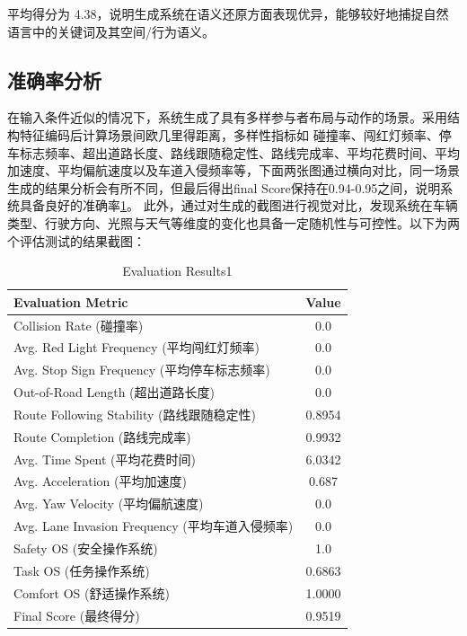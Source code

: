 平均得分为 4.38，说明生成系统在语义还原方面表现优异，能够较好地捕捉自然语言中的关键词及其空间/行为语义。

\subsection{准确率分析}
在输入条件近似的情况下，系统生成了具有多样参与者布局与动作的场景。采用结构特征编码后计算场景间欧几里得距离，多样性指标如 碰撞率、闯红灯频率、停车标志频率、超出道路长度、路线跟随稳定性、路线完成率、平均花费时间、平均加速度、平均偏航速度以及车道入侵频率等，下面两张图通过横向对比，同一场景生成的结果分析会有所不同，但最后得出final Score保持在0.94-0.95之间，说明系统具备良好的准确率\ref{tab:evaluation_results}。
此外，通过对生成的截图进行视觉对比，发现系统在车辆类型、行驶方向、光照与天气等维度的变化也具备一定随机性与可控性。以下为两个评估测试的结果截图：
\begin{table}[H]
	\centering
	\begin{tabular}{|l|c|}
		\hline
		\textbf{Evaluation Metric} & \textbf{Value} \\
		\hline
		Collision Rate (碰撞率) & 0.0 \\
		\hline
		Avg. Red Light Frequency (平均闯红灯频率) & 0.0 \\
		\hline
		Avg. Stop Sign Frequency (平均停车标志频率) & 0.0 \\
		\hline
		Out-of-Road Length (超出道路长度) & 0.0 \\
		\hline
		Route Following Stability (路线跟随稳定性) & 0.8954 \\
		\hline
		Route Completion (路线完成率) & 0.9932 \\
		\hline
		Avg. Time Spent (平均花费时间) & 6.0342 \\
		\hline
		Avg. Acceleration (平均加速度) & 0.687 \\
		\hline
		Avg. Yaw Velocity (平均偏航速度) & 0.0 \\
		\hline
		Avg. Lane Invasion Frequency (平均车道入侵频率) & 0.0 \\
		\hline
		Safety OS (安全操作系统) & 1.0 \\
		\hline
		Task OS (任务操作系统) & 0.6863 \\
		\hline
		Comfort OS (舒适操作系统) & 1.0000 \\
		\hline
		Final Score (最终得分) & 0.9519 \\
		\hline
	\end{tabular}
	\caption{Evaluation Results1}
	\label{tab:evaluation_results}
\end{table}

